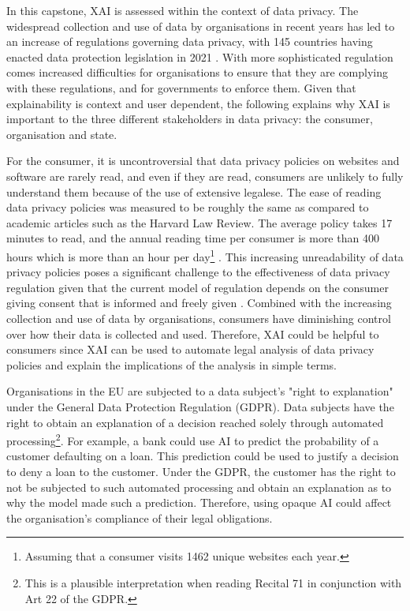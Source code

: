 \documentclass[11pt]{article}
\begin{document}
In this capstone, XAI is assessed within the context of data privacy. The widespread collection and use of data by organisations in recent years has led to an increase of regulations governing data privacy, with 145 countries having enacted data protection legislation in 2021 \cite{gstrein2022}. With more sophisticated regulation comes increased difficulties for organisations to ensure that they are complying with these regulations, and for governments to enforce them. Given that explainability is context and user dependent, the following explains why XAI is important to the three different stakeholders in data privacy: the consumer, organisation and state.

For the consumer, it is uncontroversial that data privacy policies on websites and software are rarely read, and even if they are read, consumers are unlikely to fully understand them because of the use of extensive legalese. The ease of reading data privacy policies was measured to be roughly the same as compared to academic articles such as the Harvard Law Review. The average policy takes 17 minutes to read, and the annual reading time per consumer is more than 400 hours which is more than an hour per day\footnote{Assuming that a consumer visits 1462 unique websites each year.} \cite{wagner2022privacy}. This increasing unreadability of data privacy policies poses a significant challenge to the effectiveness of data privacy regulation given that the current model of regulation depends on the consumer giving consent that is informed and freely given \cite{mantelero_2014}. Combined with the increasing collection and use of data by organisations, consumers have diminishing control over how their data is collected and used. Therefore, XAI could be helpful to consumers since XAI can be used to automate legal analysis of data privacy policies and explain the implications of the analysis in simple terms.

Organisations in the EU are subjected to a data subject's "right to explanation" under the General Data Protection Regulation (GDPR). Data subjects have the right to obtain an explanation of a decision reached solely through automated processing\footnote{This is a plausible interpretation when reading Recital 71 in conjunction with Art 22 of the GDPR.}. For example, a bank could use AI to predict the probability of a customer defaulting on a loan. This prediction could be used to justify a decision to deny a loan to the customer. Under the GDPR, the customer has the right to not be subjected to such automated processing and obtain an explanation as to why the model made such a prediction. Therefore, using opaque AI could affect the organisation's compliance of their legal obligations.
\end{document}
